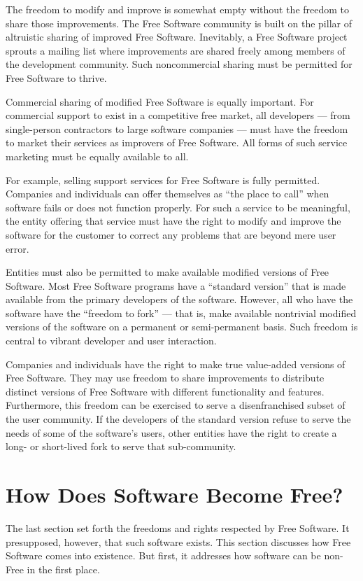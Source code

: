 The freedom to modify and improve is somewhat empty without the freedom to
share those improvements. The Free Software community is built on the
pillar of altruistic sharing of improved Free Software. Inevitably, a
Free Software project sprouts a mailing list where improvements are shared
freely among members of the development community. Such noncommercial
sharing must be permitted for Free Software to thrive.

Commercial sharing of modified Free Software is equally important.
For commercial support to exist in a competitive free market, all
developers --- from single-person contractors to large software
companies --- must have the freedom to market their services as
improvers of Free Software. All forms of such service marketing must
be equally available to all.

For example, selling support services for Free Software is fully
permitted. Companies and individuals can offer themselves as ``the place
to call'' when software fails or does not function properly. For such a
service to be meaningful, the entity offering that service must have the
right to modify and improve the software for the customer to correct any
problems that are beyond mere user error.

Entities must also be permitted to make available modified versions of
Free Software. Most Free Software programs have a ``standard version''
that is made available from the primary developers of the software.
However, all who have the software have the ``freedom to fork'' --- that
is, make available nontrivial modified versions of the software on a
permanent or semi-permanent basis. Such freedom is central to vibrant
developer and user interaction.

Companies and individuals have the right to make true value-added versions
of Free Software. They may use freedom to share improvements to
distribute distinct versions of Free Software with different functionality
and features. Furthermore, this freedom can be exercised to serve a
disenfranchised subset of the user community. If the developers of the
standard version refuse to serve the needs of some of the software's
users, other entities have the right to create a long- or short-lived fork
to serve that sub-community.

\section{How Does Software Become Free?}

The last section set forth the freedoms and rights respected by Free
Software. It presupposed, however, that such software exists. This
section discusses how Free Software comes into existence. But first, it
addresses how software can be non-Free in the first place.

